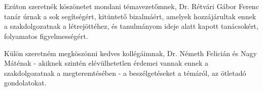 \chapter*{\koszonetnyilvanitas}

Ezúton szeretnék köszönetet mondani témavezetőmnek, Dr. Rétvári Gábor Ferenc tanár úrnak a sok
segítségért, kitüntető bizalmáért, amelyek hozzájárultak ennek a szakdolgozatnak a
létrejöttéhez, és tanulmányom ideje alatt kapott tanácsokért, folyamatos figyelmességért.

Külön szeretném megköszönni kedves kollégáimnak, Dr. Németh Felicián és Nagy Máténak - akiknek
szintén elévülhetetlen érdemei vannak ennek a szakdolgozatnak a megteremtésében - a
beszélgetéseket a témáról, az ötletadó gondolatokat.